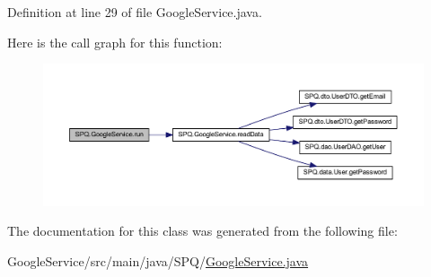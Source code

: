 Definition at line 29 of file Google\+Service.\+java.

Here is the call graph for this function\+:
\nopagebreak
\begin{figure}[H]
\begin{center}
\leavevmode
\includegraphics[width=350pt]{class_s_p_q_1_1_google_service_aecd41a7e761dc392fc96e096547dc504_cgraph}
\end{center}
\end{figure}


The documentation for this class was generated from the following file\+:\begin{DoxyCompactItemize}
\item 
Google\+Service/src/main/java/\+S\+P\+Q/\mbox{\hyperlink{_google_service_8java}{Google\+Service.\+java}}\end{DoxyCompactItemize}
